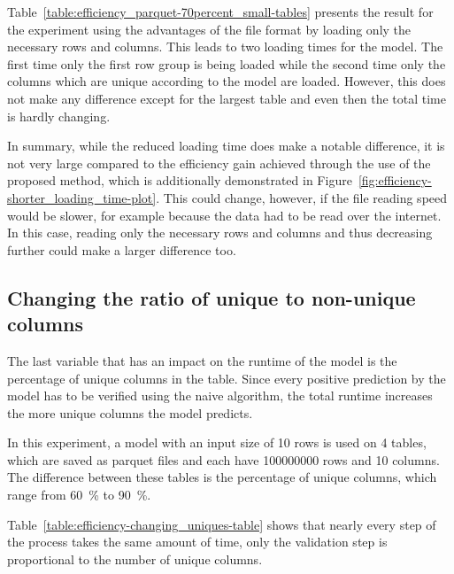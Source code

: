 Table~\ref{table:efficiency_parquet-70percent_small-tables} presents the result for the experiment using the advantages of the file format by loading only the necessary rows and columns. This leads to two loading times for the model. The first time only the first row group is being loaded while the second time only the columns which are unique according to the model are loaded. However, this does not make any difference except for the largest table and even then the total time is hardly changing.





In summary, while the reduced loading time does make a notable difference, it is not very large compared to the efficiency gain achieved through the use of the proposed method, which is additionally demonstrated in Figure~\ref{fig:efficiency-shorter_loading_time-plot}. This could change, however, if the file reading speed would be slower, for example because the data had to be read over the internet. In this case, reading only the necessary rows and columns and thus decreasing \io{} further could make a larger difference too.




\subsection{Changing the ratio of unique to non-unique columns}\label{subsec:efficiency-changing_uniques}
The last variable that has an impact on the runtime of the model is the percentage of unique columns in the table. Since every positive prediction by the model has to be verified using the naive algorithm, the total runtime increases the more unique columns the model predicts.

In this experiment, a model with an input size of \num{10} rows is used on \num{4} tables, which are saved as parquet files and each have \num{100000000} rows and \num{10} columns. The difference between these tables is the percentage of unique columns, which range from \SI{60}{\percent} to \SI{90}{\percent}.

Table~\ref{table:efficiency-changing_uniques-table} shows that nearly every step of the process takes the same amount of time, only the validation step is proportional to the number of unique columns.

